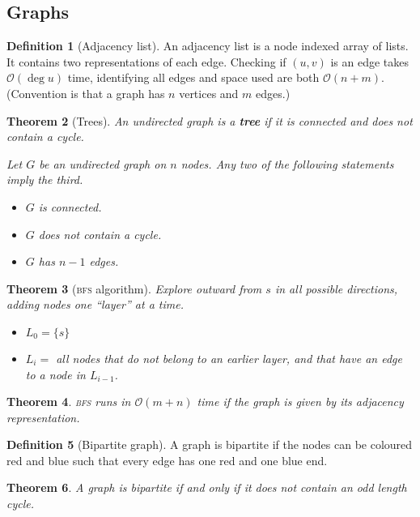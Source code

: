 \documentclass[10pt, oneside, reqno]{amsart}
\theoremstyle{plain}%
\newtheorem{thm}{Theorem}[section]
\theoremstyle{definition}
\newtheorem{defn}[thm]{Definition}
\theoremstyle{remark}
\newcommand{\bigo}[1]{\mathcal{O}(#1)}
\begin{document}
\subsection{Graphs} %
\label{sub:graphs}

\begin{defn}[Adjacency list]
    An adjacency list is a node indexed array of lists.  It contains two representations of each edge.  Checking if $(u,v)$ is an edge takes $\bigo{\deg u}$ time, identifying all edges and space used are both $\bigo{n+m}$.  (Convention is that a graph has $n$ vertices and $m$ edges.)
\end{defn}

\begin{thm}[Trees]
    An undirected graph is a \textbf{tree} if it is connected and does not contain a cycle.  
    
    Let $G$ be an undirected graph on $n$ nodes. Any two of the following statements imply the third.
    \begin{itemize}
        \item $G$ is connected.
        \item $G$ does not contain a cycle.
        \item $G$ has $n-1$ edges.
    \end{itemize}
\end{thm}


\begin{thm}[\textsc{bfs} algorithm]
    Explore outward from $s$ in all possible directions, adding nodes one ``layer'' at a time.  
    \begin{itemize}
        \item $L_0 = \{s\}$
        \item $L_{i} = $ all nodes that do not belong to an earlier layer, and that have an edge to a node in $L_{i-1}$.
    \end{itemize}
\end{thm}

\begin{thm}
    \textsc{bfs} runs in $\bigo{m+n}$ time if the graph is given by its adjacency representation.
\end{thm}

\begin{defn}[Bipartite graph]
    A graph is bipartite if the nodes can be coloured red and blue such that every edge has one red and one blue end.
\end{defn}

\begin{thm}
    A graph is bipartite if and only if it does not contain an odd length cycle.
\end{thm}
\end{document}
